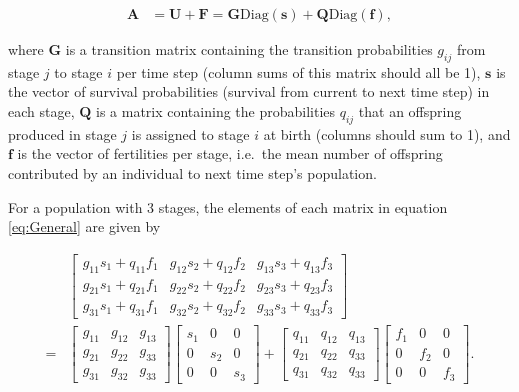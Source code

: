 \documentclass[
]{book}
\begin{document}
\begin{align}
\mathbf{A}&=\mathbf{U}+\mathbf{F}=\mathbf{G}\text{Diag}(\mathbf{s})+\mathbf{Q}\text{Diag}(\mathbf{f}),
\label{eq:General}
\end{align}

where \(\mathbf{G}\) is a transition matrix containing the transition probabilities \(g_{ij}\) from stage \(j\) to stage \(i\) per time step (column sums of this matrix should all be 1), \(\mathbf{s}\) is the vector of survival probabilities (survival from current to next time step) in each stage, \(\mathbf{Q}\) is a matrix containing the probabilities \(q_{ij}\) that an offspring produced in stage \(j\) is assigned to stage \(i\) at birth (columns should sum to 1), and \(\mathbf{f}\) is the vector of fertilities per stage, i.e.~the mean number of offspring contributed by an individual to next time step's population.

For a population with 3 stages, the elements of each matrix in equation \eqref{eq:General} are given by

\begin{align*}
&\left[\begin{matrix} 
g_{11}s_1+q_{11}f_1  & g_{12}s_2+q_{12}f_2 & g_{13}s_3+q_{13}f_3\\ 
g_{21}s_1+q_{21}f_1  & g_{22}s_2+q_{22}f_2 & g_{23}s_3+q_{23}f_3\\ 
g_{31}s_1+q_{31}f_1  & g_{32}s_2+q_{32}f_2 & g_{33}s_3+q_{33}f_3 
\end{matrix}\right]\\
=
&\left[\begin{matrix} 
g_{11} & g_{12}& g_{13} \\ 
g_{21} & g_{22}& g_{33} \\ 
g_{31} & g_{32}& g_{33}  
\end{matrix}\right]
\left[\begin{matrix} 
s_1 & 0& 0 \\ 
0 & s_2&0 \\ 
0 & 0& s_3 
\end{matrix}\right]+
\left[\begin{matrix} 
q_{11} & q_{12}& q_{13} \\ 
q_{21} & q_{22}& q_{33} \\ 
q_{31} & q_{32}& q_{33}  
\end{matrix}\right]
\left[\begin{matrix} 
f_1 & 0& 0 \\ 
0 & f_2&0 \\ 
0 & 0& f_3 
\end{matrix}\right].
\end{align*}
\end{document}
